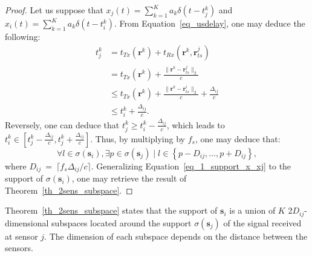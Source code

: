 \documentclass{article}
\newcommand{\vect}[1]{\bm{#1}}
\newcommand{\ser}[2]{#1^{#2}}
\theoremstyle{definition}
\begin{document}
\begin{proof}
	Let us suppose that $x_j \left(t\right) = \sum_{k=1}^{K} a_k \delta \left(t - \ser{t_j}{k}\right)$ and $x_i \left(t\right) = \sum_{k=1}^{K} a_k \delta \left(t - \ser{t_i}{k}\right)$. From Equation~\eqref{eq_usdelay}, one may deduce the following:
	\begin{align*}
	\ser{t_j}{k} &= t_{Tx}\left(\vect{r}^k\right) + t_{Rx}\left(\vect{r}^k, \ser{\vect{r}_{ts}}{j}\right) \\
	&= t_{Tx}\left(\vect{r}^k\right) + \frac{\|\vect{r}^k - \ser{\vect{r}_{ts}}{j} \|_2}{c}\\
	&\leq  t_{Tx}\left(\vect{r}^k\right) + \frac{\|\vect{r}^k - \ser{\vect{r}_{ts}}{i} \|_2}{c} + \frac{\Delta_{ij}}{c}\\
	&\leq \ser{t_i}{k} + \frac{\Delta_{ij}}{c}.
	\end{align*}
	Reversely, one can deduce that $\ser{t_j}{k} \geq \ser{t_i}{k} - \frac{\Delta_{ij}}{c}$, which leads to $\ser{t_i}{k} \in \left[\ser{t_j}{k} -\frac{\Delta_{ij}}{c}, \ser{t_j}{k} +\frac{\Delta_{ij}}{c}\right]$. Thus, by multiplying by $f_s$, one may deduce that:
	\begin{equation}
	\label{eq_1_support_x_xj}
		\forall l \in \sigma\left(\vect{s}_i\right), \exists p \in \sigma \left(\vect{s}_j\right) \; | \; l \in \left\lbrace p-D_{ij},\dots,p+D_{ij}\right\rbrace,
	\end{equation}
	where $D_{ij}~=~\lceil f_s \Delta_{ij}/ c  \rceil$. Generalizing Equation~\eqref{eq_1_support_x_xj} to the support of $\sigma\left(\vect{s}_i\right)$, one may retrieve the result of Theorem~\ref{th_2sens_subspace}.
\end{proof}
Theorem~\ref{th_2sens_subspace} states that the support of $\vect{s}_i$ is a union of $K$ \num{2}$D_{ij}$-dimensional subspaces located around the support $\sigma \left(\vect{s}_j\right)$ of the signal received at sensor $j$. The dimension of each subspace depends on the distance between the sensors. 
\end{document}
